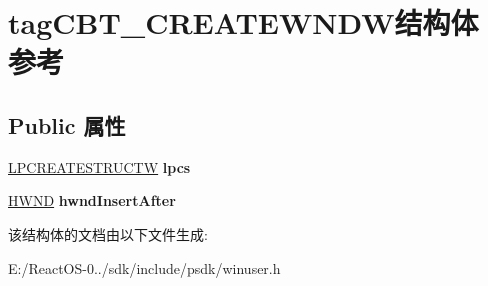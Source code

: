 \hypertarget{structtag_c_b_t___c_r_e_a_t_e_w_n_d_w}{}\section{tag\+C\+B\+T\+\_\+\+C\+R\+E\+A\+T\+E\+W\+N\+D\+W结构体 参考}
\label{structtag_c_b_t___c_r_e_a_t_e_w_n_d_w}
\subsection*{Public 属性}
\begin{DoxyCompactItemize}
\item 
\mbox{\label{structtag_c_b_t___c_r_e_a_t_e_w_n_d_w_a492f8c3033f2b7022b3074691b9d5bee}} 
\hyperlink{structtag_c_r_e_a_t_e_s_t_r_u_c_t_w}{L\+P\+C\+R\+E\+A\+T\+E\+S\+T\+R\+U\+C\+TW} {\bfseries lpcs}
\item 
\mbox{\label{structtag_c_b_t___c_r_e_a_t_e_w_n_d_w_affe7151dec19a67bb12cdc7733295685}} 
\hyperlink{interfacevoid}{H\+W\+ND} {\bfseries hwnd\+Insert\+After}
\end{DoxyCompactItemize}


该结构体的文档由以下文件生成\+:\begin{DoxyCompactItemize}
\item 
E\+:/\+React\+O\+S-\/0../sdk/include/psdk/winuser.\+h\end{DoxyCompactItemize}
